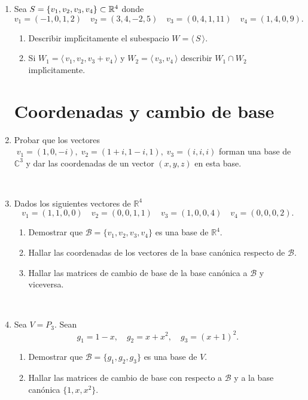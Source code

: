 \documentclass[12pt,spanish,makeidx]{amsbook}
\newcommand\R{\mathbb{R}}
\begin{document}
\begin{enumerate}
	\
	
	\item Sea  $S=\{v_1,v_2,v_3,v_4\}\subset\Bbb R^4$  donde
	$$
	v_1=(-1,0,1,2) \quad v_2=(3,4,-2,5) \quad v_3=(0,4,1,11) \quad
	v_4=(1,4,0,9).
	$$
	\begin{enumerate}
		\item  Describir impl{\'\i}citamente el subespacio  $W= \langle \, S\, \rangle$.
		\item Si $W_1 = \langle \, v_1,v_2,v_3+v_4\, \rangle $ y $W_2 = \langle \, v_3,v_4\, \rangle $
		describir $W_1\cap W_2$ impl{\'\i}citamente.
	\end{enumerate}
		
	
	
	
	\vspace{.5cm}
	
	\section*{Coordenadas y cambio de base}
	
	\vspace{.5cm}
	
	
	\item
	Probar que los vectores $\;v_1=(1,0,-i),\;
	v_2=(1+i,1-i,1),\;v_3=(i,i,i)$ forman una base de $\mathbb{C}^3$
	y dar las coordenadas de un vector $(x,y,z)$ en esta base.
		
	\
	
	\item Dados los siguientes vectores de $\R^4$
	$$
	v_1=(1,1,0,0) \quad v_2=(0,0,1,1) \quad v_3=(1,0,0,4)
	\quad v_4=(0,0,0,2).
	$$
	\begin{enumerate}
		\item Demostrar que
		$\mathcal{B}=\{v_1,v_2,v_3,v_4\}$ es una base de
		$\R ^4$.
		\item Hallar las coordenadas de los vectores de la
		base can\'onica respecto de $\mathcal{B}$.
		\item Hallar las matrices de cambio de base de la base can\'onica
		a $\mathcal{B}$ y viceversa.
	\end{enumerate}
		
	\
	
	\item  Sea $V=P_3$.
	Sean
	$$ g_1=1-x,\quad g_2=x+x^2, \quad g_3=(x+1)^2.$$
	\begin{enumerate}
		\item Demostrar que $\mathcal{B}=\{g_1,g_2,g_3\}$ es una base de $V$.
		\item Hallar las matrices de cambio de base con respecto a $\mathcal{B}$
		y a la base can{\'o}nica $\{1,x,x^2\}$.
	\end{enumerate}
		

\end{enumerate}
\end{document}
